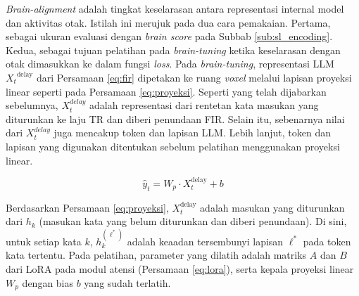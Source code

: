 \textit{Brain-alignment} adalah tingkat keselarasan antara representasi internal model dan aktivitas otak. Istilah ini merujuk pada dua cara pemakaian. Pertama, sebagai ukuran evaluasi dengan \textit{brain score} pada Subbab \ref{sub:sl_encoding}. Kedua, sebagai tujuan pelatihan pada \textit{brain-tuning} ketika keselarasan dengan otak dimasukkan ke dalam fungsi \textit{loss}. Pada \textit{brain-tuning}, representasi LLM ${X_t}^{\text{delay}}$ dari Persamaan \ref{eq:fir} dipetakan ke ruang \textit{voxel} melalui lapisan proyeksi linear seperti pada Persamaan \ref{eq:proyeksi}. Seperti yang telah dijabarkan sebelumnya, $X_t^{delay}$ adalah representasi dari rentetan kata masukan yang diturunkan ke laju TR dan diberi penundaan FIR. Selain itu, sebenarnya nilai dari $X_t^{delay}$ juga mencakup token dan lapisan LLM. Lebih lanjut, token dan lapisan yang digunakan ditentukan sebelum pelatihan menggunakan proyeksi linear. %
 
 
 
 


\begin{equation}
  \hat{y}_t = W_p \cdot X_t^{\text{delay}} + b
  \label{eq:proyeksi}
\end{equation}

Berdasarkan Persamaan \ref{eq:proyeksi}, $X_t^{\text{delay}}$ adalah masukan yang diturunkan dari $h_k$ (masukan kata yang belum diturunkan dan diberi penundaan). Di sini, untuk setiap kata $k$, $h_k^{(\ell^*)}$ adalah keaadan tersembunyi lapisan $\ell^*$  pada token kata tertentu. Pada pelatihan, parameter yang dilatih adalah matriks $A$ dan $B$ dari LoRA pada modul atensi (Persamaan \ref{eq:lora}), serta kepala proyeksi linear $W_p$ dengan bias $b$ yang sudah terlatih.

